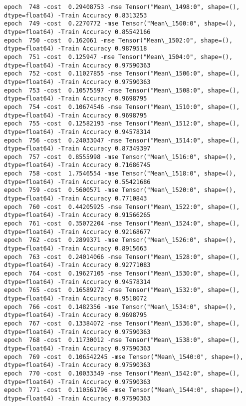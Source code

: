 \documentclass[11pt]{article}
\begin{document}
\begin{Verbatim}[commandchars=\\\{\}]
epoch  748 -cost  0.29408753 -mse Tensor("Mean\_1498:0", shape=(), dtype=float64) -Train Accuracy 0.8313253
epoch  749 -cost  0.2270772 -mse Tensor("Mean\_1500:0", shape=(), dtype=float64) -Train Accuracy 0.85542166
epoch  750 -cost  0.162061 -mse Tensor("Mean\_1502:0", shape=(), dtype=float64) -Train Accuracy 0.9879518
epoch  751 -cost  0.125947 -mse Tensor("Mean\_1504:0", shape=(), dtype=float64) -Train Accuracy 0.97590363
epoch  752 -cost  0.11027855 -mse Tensor("Mean\_1506:0", shape=(), dtype=float64) -Train Accuracy 0.97590363
epoch  753 -cost  0.10575597 -mse Tensor("Mean\_1508:0", shape=(), dtype=float64) -Train Accuracy 0.9698795
epoch  754 -cost  0.10674546 -mse Tensor("Mean\_1510:0", shape=(), dtype=float64) -Train Accuracy 0.9698795
epoch  755 -cost  0.12582193 -mse Tensor("Mean\_1512:0", shape=(), dtype=float64) -Train Accuracy 0.94578314
epoch  756 -cost  0.24033047 -mse Tensor("Mean\_1514:0", shape=(), dtype=float64) -Train Accuracy 0.87349397
epoch  757 -cost  0.8555998 -mse Tensor("Mean\_1516:0", shape=(), dtype=float64) -Train Accuracy 0.71686745
epoch  758 -cost  1.7546554 -mse Tensor("Mean\_1518:0", shape=(), dtype=float64) -Train Accuracy 0.55421686
epoch  759 -cost  0.5600571 -mse Tensor("Mean\_1520:0", shape=(), dtype=float64) -Train Accuracy 0.7710843
epoch  760 -cost  0.44205925 -mse Tensor("Mean\_1522:0", shape=(), dtype=float64) -Train Accuracy 0.91566265
epoch  761 -cost  0.35072204 -mse Tensor("Mean\_1524:0", shape=(), dtype=float64) -Train Accuracy 0.92168677
epoch  762 -cost  0.2899371 -mse Tensor("Mean\_1526:0", shape=(), dtype=float64) -Train Accuracy 0.8915663
epoch  763 -cost  0.24014066 -mse Tensor("Mean\_1528:0", shape=(), dtype=float64) -Train Accuracy 0.92771083
epoch  764 -cost  0.19627105 -mse Tensor("Mean\_1530:0", shape=(), dtype=float64) -Train Accuracy 0.94578314
epoch  765 -cost  0.16589272 -mse Tensor("Mean\_1532:0", shape=(), dtype=float64) -Train Accuracy 0.9518072
epoch  766 -cost  0.1482356 -mse Tensor("Mean\_1534:0", shape=(), dtype=float64) -Train Accuracy 0.9698795
epoch  767 -cost  0.13384072 -mse Tensor("Mean\_1536:0", shape=(), dtype=float64) -Train Accuracy 0.97590363
epoch  768 -cost  0.11730012 -mse Tensor("Mean\_1538:0", shape=(), dtype=float64) -Train Accuracy 0.97590363
epoch  769 -cost  0.106542245 -mse Tensor("Mean\_1540:0", shape=(), dtype=float64) -Train Accuracy 0.97590363
epoch  770 -cost  0.10033349 -mse Tensor("Mean\_1542:0", shape=(), dtype=float64) -Train Accuracy 0.97590363
epoch  771 -cost  0.110561796 -mse Tensor("Mean\_1544:0", shape=(), dtype=float64) -Train Accuracy 0.97590363

\end{Verbatim}
\end{document}
